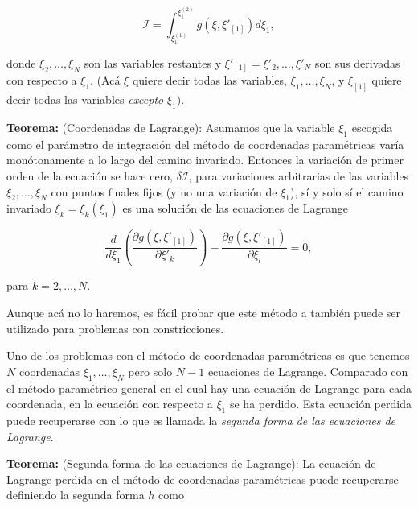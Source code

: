 \documentclass[a4paper,10pt]{article}
\numberwithin{equation}{section}
\newcommand{\teorema}{\textbf{Teorema: }}
\begin{document}
\begin{equation}
 \mathcal{I} = \int_{\xi_1^{(1)}}^{\xi_1^{(2)}} g(\xi,\xi'_{[1]})d\xi_1,
 \label{eq:6accion1}
\end{equation}

donde $\xi_2,\dots,\xi_N$ son las variables restantes y $\xi'_{[1]} = \xi'_2,\dots,\xi'_N$ son 
sus derivadas con respecto a $\xi_1$. (Acá $\xi$ quiere decir todas las variables, 
$\xi_1,\dots,\xi_N$, y $\xi_{[1]}$ quiere decir todas las variables \emph{excepto} $\xi_1$).

\vspace{.3cm}

\teorema (Coordenadas de Lagrange): Asumamos que la variable $\xi_1$ escogida como 
el parámetro de integración del método de coordenadas paramétricas varía monótonamente 
a lo largo del camino invariado. Entonces la variación de primer orden de la ecuación 
 se hace cero, $\delta\mathcal{I}$, para variaciones arbitrarias 
de las variables $\xi_2,\dots,\xi_N$ con puntos finales fijos (y no una variación de 
$\xi_1$), sí y solo sí el camino invariado $\xi_k = \xi_k(\xi_1)$ es una solución 
de las ecuaciones de Lagrange

\begin{equation}
 \frac{d}{d\xi_1}\left(\frac{\partial g(\xi,\xi'_{[1]})}{\partial \xi'_k} \right)
 - \frac{\partial g(\xi,\xi'_{[1]})}{\partial \xi_l} = 0,
 \label{eq:6lagrangeEqs1}
\end{equation}

para $k=2,\dots,N$.

\vspace{.3cm}

Aunque acá no lo haremos, es fácil probar que este método a también puede ser utilizado 
para problemas con constricciones.

\vspace{.3cm}

Uno de los problemas con el método de coordenadas paramétricas es que tenemos $N$ coordenadas 
$\xi_1,\dots,\xi_N$ pero solo $N-1$ ecuaciones de Lagrange. Comparado con el método 
paramétrico general en el cual hay una ecuación de Lagrange para cada coordenada, 
en  la ecuación con respecto a $\xi_1$ se ha perdido. Esta 
ecuación perdida puede recuperarse con lo que es llamada la \emph{segunda forma de 
las ecuaciones de Lagrange}. 

\vspace{.3cm}

\teorema (Segunda forma de las ecuaciones de Lagrange): La ecuación de Lagrange perdida 
en el método de coordenadas paramétricas puede recuperarse definiendo la segunda forma 
$h$ como
\end{document}
